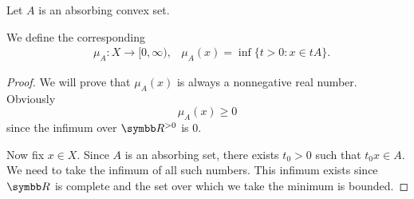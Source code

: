\begin{definition}\label{def:minkowski_functional}
  Let \( A \) is an absorbing convex set.

  We define the corresponding 
  \begin{align*}
    &\mu_A: X \to [0, \infty),
    &\mu_A(x) = \inf \{ t > 0 \colon x \in tA \}.
  \end{align*}
\end{definition}
\begin{proof}
  We will prove that \( \mu_A(x) \) is always a nonnegative real number. Obviously
  \begin{equation*}
    \mu_A(x) \geq 0
  \end{equation*}
  since the infimum over \( \R^{>0} \) is \( 0 \).

  Now fix \( x \in X \). Since \( A \) is an absorbing set, there exists \( t_0 > 0 \) such that \( t_0 x \in A \). We need to take the infimum of all such numbers. This infimum exists since \( \R \) is complete and the set over which we take the minimum is bounded.
\end{proof}
